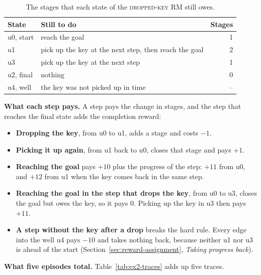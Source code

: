 \documentclass[11pt,english,listoffigures,listoftables]{tfgetsinf}
\newcommand{\runex}[1]{\textsc{#1}}  %
\newcommand{\gain}[1]{\textcolor{green!40!black}{\bfseries\boldmath #1}}  %
\newcommand{\loss}[1]{\textcolor{red!60!black}{\bfseries\boldmath #1}}  %
\begin{document}
\begin{table}[H]
\centering
\footnotesize
\renewcommand{\arraystretch}{1.2}
\begin{tabular}{@{}llr@{}}
\toprule
\textbf{State} & \textbf{Still to do} & \textbf{Stages} \\ \midrule
u0, start & reach the goal & 1 \\
u1 & pick up the key at the next step, then reach the goal & 2 \\
u3 & pick up the key at the next step & 1 \\
u2, final & nothing & 0 \\
u4, well & the key was not picked up in time & -- \\ \bottomrule
\end{tabular}
\caption[Stages owed by the states of the \runex{dropped key}]{The stages that each state of the \runex{dropped-key} RM still owes.}
\label{tab:ex2-todo}
\end{table}

\textbf{What each step pays.} A step pays the change in stages, and the step that reaches the final state adds the completion reward:
\begin{itemize}
    \item \textbf{Dropping the key}, from u0 to u1, adds a stage and costs \loss{$-1$}.
    \item \textbf{Picking it up again}, from u1 back to u0, closes that stage and pays \gain{$+1$}.
    \item \textbf{Reaching the goal} pays \gain{$+10$} plus the progress of the step: \gain{$+11$} from u0, and \gain{$+12$} from u1 when the key comes back in the same step.
    \item \textbf{Reaching the goal in the step that drops the key}, from u0 to u3, closes the goal but owes the key, so it pays 0. Picking up the key in u3 then pays \gain{$+11$}.
    \item \textbf{A step without the key after a drop} breaks the hard rule. Every edge into the well u4 pays \loss{$-10$} and takes nothing back, because neither u1 nor u3 is ahead of the start (Section~\ref{sec:reward-assignment}, \emph{Taking progress back}).
\end{itemize}

\textbf{What five episodes total.} Table~\ref{tab:ex2-traces} adds up five traces.
\end{document}
